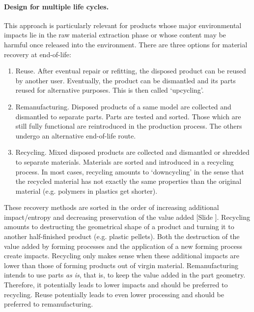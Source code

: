 \documentclass{article}
\newcounter{slide}
\begin{document}
\paragraph{Design for multiple life cycles.}
\label{sec:DfR}
This approach is particularly relevant for products whose major environmental impacts lie in the raw material extraction phase or whose content may be harmful once released into the environment. There are three options for material recovery at end-of-life:
\begin{enumerate}
	\item Reuse. After eventual repair or refitting, the disposed product can be reused by another user. Eventually, the product can be dismantled and its parts reused for alternative purposes. This is then called `upcycling'. 
	\item Remanufacturing. Disposed products of a same model are collected and dismantled to separate parts. Parts are tested and sorted. Those which are still fully functional are reintroduced in the production process. The others undergo an alternative end-of-life route.
	\item Recycling. Mixed disposed products are collected and dismantled or shredded to separate materials. Materials are sorted and introduced in a recycling process. In most cases, recycling amounts to `downcycling' in the sense that the recycled material has not exactly the same properties than the original material (e.g. polymers in plastics get shorter).
\end{enumerate}
These recovery methods are sorted in the order of increasing additional impact/entropy and decreasing preservation of the value added {\color{blue}[Slide ]}. Recycling amounts to destructing the geometrical shape of a product and turning it to another half-finished product (e.g. plastic pellets). Both the destruction of the value added by forming processes and the application of a new forming process create impacts. Recycling only makes sense when these additional impacts are lower than those of forming products out of virgin material. Remanufacturing intends to use parts \emph{as is}, that is, to keep the value added in the part geometry. Therefore, it potentially leads to lower impacts and should be preferred to recycling. Reuse potentially leads to even lower processing and should be preferred to remanufacturing. 
\end{document}
